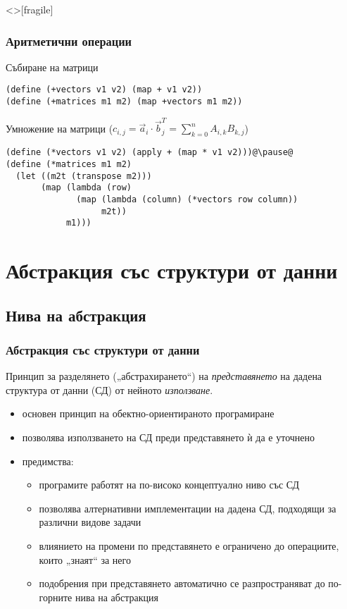 \documentclass[alsotrans,beameroptions={aspectratio=169}]{beamerswitch}
\begin{document}
\begin{frame}<>[fragile]
  \frametitle{Аритметични операции}

  Събиране на матрици
  \pause
\begin{lstlisting}
(define (+vectors v1 v2) (map + v1 v2))
(define (+matrices m1 m2) (map +vectors m1 m2))
\end{lstlisting}
  \pause
  \vspace{2ex}
  Умножение на матрици \pause
  ($c_{i,j} = \vec a_i\cdot \vec b^T_j = \sum_{k=0}^n A_{i,k}B_{k,j}$)
  \pause
  \small
\begin{lstlisting}
(define (*vectors v1 v2) (apply + (map * v1 v2)))@\pause@
(define (*matrices m1 m2)
  (let ((m2t (transpose m2)))
       (map (lambda (row)
              (map (lambda (column) (*vectors row column))
                   m2t))
            m1)))
\end{lstlisting}
\end{frame}

\section{Абстракция със структури от данни}

\subsection{Нива на абстракция}

\begin{frame}[<+->]
  \frametitle{Абстракция със структури от данни}

  \begin{definition}[Абстракция]
    Принцип за разделянето („абстрахирането“) на \emph{представянето} на дадена структура от данни (СД) от нейното \emph{използване}.
  \end{definition}
  \begin{itemize}
  \item основен принцип на обектно-ориентираното програмиране
  \item позволява използването на СД преди представянето ѝ да е уточнено
  \item предимства:
    \begin{itemize}
    \item програмите работят на по-високо концептуално ниво със СД
    \item позволява алтернативни имплементации на дадена СД, подходящи за различни видове задачи
    \item влиянието на промени по представянето е ограничено до операциите, които „знаят“ за него
    \item подобрения при представянето автоматично се разпространяват до по-горните нива на абстракция
    \end{itemize}
  \end{itemize}
\end{frame}
\end{document}
